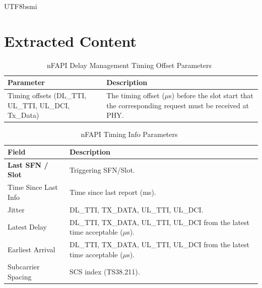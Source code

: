 \documentclass[conference,onecolumn]{IEEEtran}
\begin{document}
\begin{CJK}{UTF8}{bsmi}
\section*{Extracted Content}

\begin{table}[htbp]
\caption{nFAPI Delay Management Timing Offset Parameters~\cite{nfapi_spec}}
\label{tab:delay_mgmt_offsets}
\begin{center}
\begin{tabularx}{\columnwidth}{X|X}
\toprule
\textbf{Parameter} & \textbf{Description} \\ \midrule
Timing offsets (DL\_TTI, UL\_TTI, UL\_DCI, Tx\_Data) & The timing offset ($\mu$s) before the slot start that the corresponding request must be received at PHY. \\ \bottomrule
\end{tabularx}
\end{center}
\end{table}

\hrulefill\par\vspace{1cm}

\begin{table}[htbp]
\caption{nFAPI Timing Info Parameters~\cite{nfapi_spec}}
\label{tab:timing_info}
\begin{center}
\begin{tabularx}{\columnwidth}{l|X}
\toprule
\textbf{Field} & \textbf{Description} \\ \midrule
\textbf{Last SFN / Slot} & Triggering SFN/Slot. \\ 
Time Since Last Info & Time since last report (ms). \\ 
Jitter & DL\_TTI, TX\_DATA, UL\_TTI, UL\_DCI. \\ 
Latest Delay & DL\_TTI, TX\_DATA, UL\_TTI, UL\_DCI from the latest time acceptable ($\mu$s). \\ 
Earliest Arrival & DL\_TTI, TX\_DATA, UL\_TTI, UL\_DCI from the latest time acceptable ($\mu$s). \\ 
Subcarrier Spacing & SCS index (TS38.211). \\ \bottomrule
\end{tabularx}
\end{center}
\end{table}

\hrulefill\par\vspace{1cm}


\end{CJK}
\end{document}
